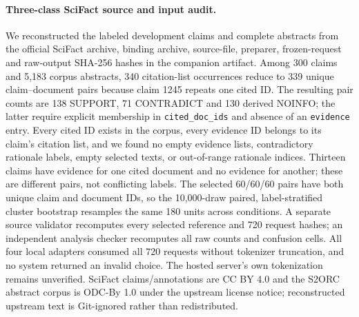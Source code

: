 \paragraph{Three-class SciFact source and input audit.}\label{app:scifact3-audit}
We reconstructed the labeled development claims and complete abstracts from the official SciFact archive, binding archive, source-file, preparer, frozen-request and raw-output SHA-256 hashes in the companion artifact. Among 300 claims and 5,183 corpus abstracts, 340 citation-list occurrences reduce to 339 unique claim--document pairs because claim 1245 repeats one cited ID. The resulting pair counts are 138 SUPPORT, 71 CONTRADICT and 130 derived NOINFO; the latter require explicit membership in \texttt{cited\_doc\_ids} and absence of an \texttt{evidence} entry. Every cited ID exists in the corpus, every evidence ID belongs to its claim's citation list, and we found no empty evidence lists, contradictory rationale labels, empty selected texts, or out-of-range rationale indices. Thirteen claims have evidence for one cited document and no evidence for another; these are different pairs, not conflicting labels. The selected 60/60/60 pairs have both unique claim and document IDs, so the 10,000-draw paired, label-stratified cluster bootstrap resamples the same 180 units across conditions. A separate source validator recomputes every selected reference and 720 request hashes; an independent analysis checker recomputes all raw counts and confusion cells. All four local adapters consumed all 720 requests without tokenizer truncation, and no system returned an invalid choice. The hosted server's own tokenization remains unverified. SciFact claims/annotations are CC BY 4.0 and the S2ORC abstract corpus is ODC-By 1.0 under the upstream license notice; reconstructed upstream text is Git-ignored rather than redistributed.
